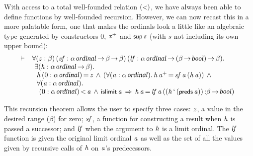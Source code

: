 \documentclass[11pt]{llncs}
\renewcommand{\HOLConst}[1]{{\textsf{\upshape\small #1}}}
\renewcommand{\HOLTyOp}[1]{\mbox{\fontencoding{T1}\fontfamily{bch}\fontseries{m}\fontshape{it}\fontsize{9.5}{10}\selectfont #1}}
\renewcommand{\HOLinline}[1]{\ensuremath{#1}}
\newcommand{\holthmenv}[1]{\begin{array}[t]{l}#1\end{array}}
\begin{document}
\begin{theorem}
With access to a total well-founded relation \HOLinline{(\HOLConst{\ensuremath{{<}}})}, we have always been able to define functions by well-founded recursion.
However, we can now recast this in a more palatable form, one that makes the ordinals look a little like an algebraic type generated by constructors \HOLinline{0}, \HOLinline{\HOLFreeVar{x}\HOLTokenSupPlus{}} and \HOLinline{\HOLConst{sup}\,\HOLFreeVar{s}} (with $s$ not including its own upper bound):
\[
\vdash \;
\holthmenv{\ensuremath{{\forall}}(\HOLBoundVar{z} :\ensuremath{\beta})\,(\HOLBoundVar{sf} :\ensuremath{\alpha}\,\HOLTyOp{ordinal}\,\ensuremath{{\rightarrow}}\,\ensuremath{\beta}\,\ensuremath{{\rightarrow}}\,\ensuremath{\beta})\,(\HOLBoundVar{lf} :\ensuremath{\alpha}\,\HOLTyOp{ordinal}\,\ensuremath{{\rightarrow}}\,(\ensuremath{\beta}\,\ensuremath{{\rightarrow}}\,\HOLTyOp{bool})\,\ensuremath{{\rightarrow}}\,\ensuremath{\beta})\ensuremath{.}\\
\,\,\ensuremath{{\exists}}(\HOLBoundVar{h} :\ensuremath{\alpha}\,\HOLTyOp{ordinal}\,\ensuremath{{\rightarrow}}\,\ensuremath{\beta})\ensuremath{.}\\
\,\,\,\,\HOLBoundVar{h}\,(0 :\ensuremath{\alpha}\,\HOLTyOp{ordinal})\,{\ensuremath{=}}\,\HOLBoundVar{z}\,\HOLTokenConj{}\,(\ensuremath{{\forall}}(\HOLBoundVar{a} :\ensuremath{\alpha}\,\HOLTyOp{ordinal})\ensuremath{.}\,\HOLBoundVar{h}\,\HOLBoundVar{a}\HOLTokenSupPlus{}\,{\ensuremath{=}}\,\HOLBoundVar{sf}\,\HOLBoundVar{a}\,(\HOLBoundVar{h}\,\HOLBoundVar{a}))\,\HOLTokenConj{}\\
\,\,\,\,\ensuremath{{\forall}}(\HOLBoundVar{a} :\ensuremath{\alpha}\,\HOLTyOp{ordinal})\ensuremath{.}\\
\,\,\,\,\,\,(0 :\ensuremath{\alpha}\,\HOLTyOp{ordinal})\,\ensuremath{{<}}\,\HOLBoundVar{a}\,\HOLTokenConj{}\,\HOLConst{islimit}\,\HOLBoundVar{a}\,\HOLTokenImp{}\,\HOLBoundVar{h}\,\HOLBoundVar{a}\,{\ensuremath{=}}\,\HOLBoundVar{lf}\,\HOLBoundVar{a}\,((\HOLBoundVar{h}\,\textrm{`}\,(\HOLConst{preds}\,\HOLBoundVar{a}))\,\ensuremath{{:}}\ensuremath{\beta}\,\ensuremath{{\rightarrow}}\,\HOLTyOp{bool})}
\]
\end{theorem}
This recursion theorem allows the user to specify three cases: \HOLinline{\HOLFreeVar{z}}, a value in the desired range (\HOLinline{\ensuremath{\beta}}) for zero; \HOLinline{\HOLFreeVar{sf}}, a function for constructing a result when \HOLinline{\HOLFreeVar{h}} is passed a successor; and \HOLinline{\HOLFreeVar{lf}} when the argument to \HOLinline{\HOLFreeVar{h}} is a limit ordinal.
The \HOLinline{\HOLFreeVar{lf}} function is given the original limit ordinal \HOLinline{\HOLFreeVar{a}} as well as the set of all the values given by recursive calls of \HOLinline{\HOLFreeVar{h}} on \HOLinline{\HOLFreeVar{a}}'s predecessors.
\end{document}
